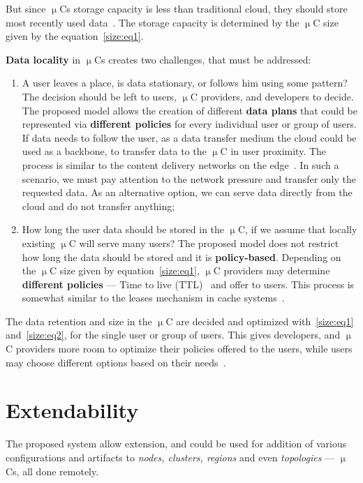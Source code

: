 But since $\upmu$Cs storage capacity is less than traditional cloud, they should store most recently used data~\cite{SimicSensors}. The storage capacity is determined by the $\upmu$C size given by the equation~\ref{size:eq1}.

\textbf{Data locality} in $\upmu$Cs creates two challenges, that must be addressed:

\begin{enumerate}[start=1,label={(\bfseries \arabic*)}]
	\item A user leaves a place, is data stationary, or follows him using some pattern? The decision should be left to users, $\upmu$C providers, and developers to decide. The proposed model allows the creation of different \textbf{data plans} that could be represented via \textbf{different policies} for every individual user or group of users. If data needs to follow the user, as a data transfer medium the cloud could be used as a backbone, to transfer data to the $\upmu$C in user proximity. The process is similar to the content delivery networks on the edge~\cite{inbookKurniawan}. In such a scenario, we must pay attention to the network pressure and transfer only the requested data. As an alternative option, we can serve data directly from the cloud and do not transfer anything;
	\item How long the user data should be stored in the $\upmu$C, if we assume that locally existing $\upmu$C will serve many users? The proposed model does not restrict how long the data should be stored and it is \textbf{policy-based}. Depending on the $\upmu$C size given by equation~\ref{size:eq1}, $\upmu$C providers may determine \textbf{different policies} --- Time to live (TTL)~\cite{CohenHK05} and offer to users. This process is somewhat similar to the leases mechanism in cache systems~\cite{GrayC89}. 
\end{enumerate}

The data retention and size in the $\upmu$C are decided and optimized with~\ref{size:eq1} and~\ref{size:eq2}, for the single user or group of users. This gives developers, and $\upmu$C providers more room to optimize their policies offered to the users, while users may choose different options based on their needs~\cite{SimicSensors}.
%
%
\section{Extendability}\label{sec:extendability}
%
The proposed system allow extension, and could be used for addition of various configurations and artifacts to \emph{nodes, clusters, regions} and even \emph{topologies} --- $\upmu$Cs, all done remotely. 

